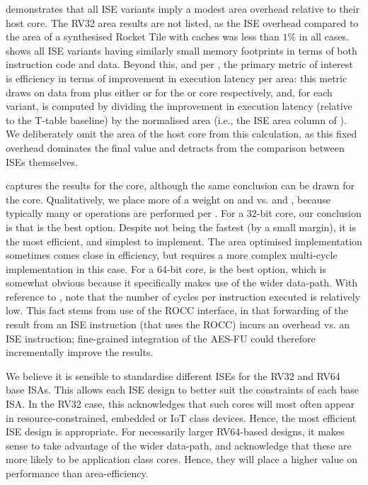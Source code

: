 
demonstrates that all ISE variants
imply a modest area overhead relative to their host core.
The RV32  area results are not listed, as the ISE overhead compared to
the area of a synthesised Rocket Tile with caches was less than $1\%$ in all
cases.
shows all ISE variants
having similarly small memory footprints in terms of both instruction code and
data.
Beyond this, and per 
,
the primary metric of interest is efficiency in terms of
improvement in execution latency per area:
this metric draws on data from
plus either
or
for the  or  core respectively,
and, for each variant, is computed by dividing the improvement in execution 
latency (relative to the T-table baseline) by the normalised area (i.e., the 
ISE area column of ). We deliberately omit the area of
the host core from this calculation, as this fixed overhead dominates the
final value and detracts from the comparison between ISEs themselves.

captures the results for the  core, although the same conclusion can 
be drawn for the  core.  Qualitatively, we place more of a weight on 
and 
vs.
and 
,
because
typically many  or  operations are performed per
.
For a $32$-bit core, our conclusion is that
is the best option.
Despite not being the fastest (by a small margin), it is the most efficient,
and simplest to implement.
The area optimised  implementation sometimes comes close in
efficiency, but requires a more complex multi-cycle implementation
in this case.
For a $64$-bit core,
is the best option, which is somewhat obvious because it specifically makes
use of the wider data-path.
With reference to
, 
note that the number of cycles per instruction executed is relatively low.
This fact stems from use of the ROCC interface, in that forwarding of the 
result from an ISE instruction (that uses the ROCC) incurs an overhead vs. 
an ISE instruction; fine-grained integration of the AES-FU could therefore
incrementally improve the results.

We believe it is sensible to standardise different ISEs for the
RV32 and RV64 base ISAs.
This allows each ISE design to better suit the constraints of each
base ISA.
In the RV32 case, this acknowledges that such cores will most often
appear in resource-constrained, embedded or IoT class devices.
Hence, the most efficient ISE design is appropriate.
For necessarily larger RV64-based designs, it makes sense to take advantage
of the wider data-path, and acknowledge that these are more likely to
be application class cores. Hence, they will place a higher value
on performance than area-efficiency.

